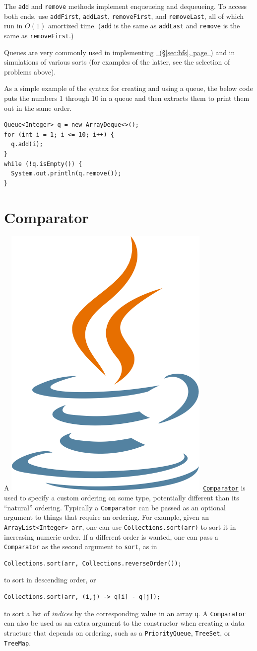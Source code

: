 \documentclass[10pt]{book}
\newcommand*{\fulllink}[1]{\hyperref[{#1}]{\nameref*{#1}~(\S\ref*{#1}, page~\pageref*{#1})}}
\newcommand{\javalogo}{\includegraphics[height=0.9\baselineskip]{Java}}
\newcommand*{\javadoclink}[2]{\href{https://docs.oracle.com/javase/10/docs/api/java/#1/#2.html}{\texttt{#2}}}
\newcommand*{\javadoc}[2]{\javalogo\ \javadoclink{#1}{#2}}
\newif\iftodos
\newcommand{\todo}[1]{\iftodos\textcolor{red}{[TODO: #1]}\fi}
\begin{document}
The \texttt{add} and \texttt{remove} methods implement enqueueing and
dequeueing.  To access both ends, use \texttt{addFirst},
\texttt{addLast}, \texttt{removeFirst}, and \texttt{removeLast}, all
of which run in $O(1)$ amortized time. (\texttt{add} is the same as
\texttt{addLast} and \texttt{remove} is the same as
\texttt{removeFirst}.)

Queues are very commonly used in implementing \fulllink{sec:bfs} and
in simulations of various sorts (for examples of the latter, see the
selection of problems above).

As a simple example of the syntax for creating and using a queue, the
below code puts the numbers 1 through 10 in a queue and then extracts
them to print them out in the same order.
\begin{verbatim}
Queue<Integer> q = new ArrayDeque<>();
for (int i = 1; i <= 10; i++) {
  q.add(i);
}
while (!q.isEmpty()) {
  System.out.println(q.remove());
}
\end{verbatim}

\section{Comparator}
\label{sec:comparator}

A \javadoc{util}{Comparator} is used to specify a custom ordering on
some type, potentially different than its ``natural'' ordering.
Typically a \texttt{Comparator} can be passed as an optional argument
to things that require an ordering.  For example, given an
\texttt{ArrayList<Integer> arr}, one can use
\texttt{Collections.sort(arr)} to sort it in increasing numeric order.
If a different order is wanted, one can pass a \texttt{Comparator} as
the second argument to \texttt{sort}, as in
\begin{verbatim}
Collections.sort(arr, Collections.reverseOrder());
\end{verbatim}
to sort in descending order, or
\begin{verbatim}
Collections.sort(arr, (i,j) -> q[i] - q[j]);
\end{verbatim}
to sort a list of \emph{indices} by the corresponding value in an
array \texttt{q}.  A \texttt{Comparator} can also be used as an extra
argument to the constructor when creating a data structure that
depends on ordering, such as a \texttt{PriorityQueue},
\texttt{TreeSet}, or \texttt{TreeMap}.

\todo{Constructing Comparators via lambda; constructing via things
  like \texttt{comparing}, \texttt{thenComparing}.
  \texttt{Collections.reverseOrder()}.}
\end{document}
